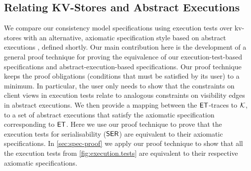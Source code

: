 \subsection{Relating KV-Stores and Abstract Executions}
We compare our consistency model specifications using execution tests over kv-stores 
with an alternative, axiomatic specification style based on abstract 
executions \cite{framework-concur}, defined shortly. 
Our main contribution here is the development of a general proof technique for proving the equivalence of our execution-test-based specifications and abstract-execution-based specifications.
Our proof technique keeps the proof obligations (conditions that must be satisfied by its user) to a minimum. 
In particular, the user only needs to show that the constraints on client views in execution tests relate to analogous constraints on visibility edges in abstract executions.
We then provide a mapping between the \(\mathsf{ET}\)-traces to 
\(\mathcal{K}\), to a set of abstract executions that satisfy the axiomatic specification corresponding to \(\mathsf{ET}\).
Here we use our proof technique to prove that the execution 
tests for serialisability (\(\mathsf{SER}\)) are equivalent to their 
axiomatic specifications. In \cref{sec:spec-proof} we apply our proof technique 
to show that all the execution tests from \cref{fig:execution.tests} are equivalent 
to their respective axiomatic specifications. 

